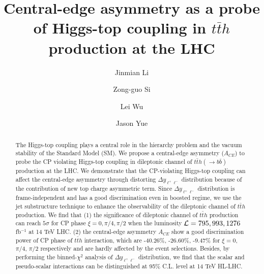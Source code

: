 \documentclass[twocolumn,prd,noshowpacs,nofootinbib,amsmath,amssymb,superscriptaddress,preprintnumbers]{revtex4}
\begin{document}
\title{Central-edge asymmetry as a probe of Higgs-top coupling in $t\bar{t}h$ production at the LHC}
\author{Jinmian Li}
\author{Zong-guo Si}
\author{Lei Wu}
\author{Jason Yue}
 \preprint{}

\begin{abstract}
The Higgs-top coupling plays a central role in the hierarchy problem and the vacuum stability of the Standard Model (SM). We propose a central-edge asymmetry ($A_{CE}$) to probe the CP violating Higgs-top coupling in dileptonic channel of $t\bar{t}h(\to b\bar{b})$ production at the LHC. We demonstrate that the CP-violating Higgs-top coupling can affect the central-edge asymmetry through distorting $\Delta y_{\ell^+\ell^-}$ distribution because of the contribution of new top charge asymmetric term. Since $\Delta y_{\ell^+\ell^-}$ distribution is frame-independent and has a good discrimination even in boosted regime, we use the jet substructure technique to enhance the observability of the dileptonic channel of $t\bar{t}h$ production. We find that (1) the significance of dileptonic channel of $t\bar{t}h$ production can reach $5\sigma$ for CP phase $\xi=0,\pi/4,\pi/2$ when the luminosity ${\cal L}=795,993,1276$ fb$^{-1}$ at 14 TeV LHC. (2) the central-edge asymmetry $A_{CE}$ show a good discrimination power of CP phase of $t\bar{t}h$ interaction, which are -40.26\%, -26.60\%, -9.47\% for $\xi=0$, $\pi/4$, $ \pi/2$ respectively and are hardly affected by the event selections. Besides, by performing the binned-$\chi^2$ analysis of $\Delta y_{\ell^+\ell^-}$ distribution, we find that the scalar and pseudo-scalar interactions can be distinguished at 95\% C.L. level at 14 TeV HL-LHC.
\end{abstract}


\maketitle
\end{document}
